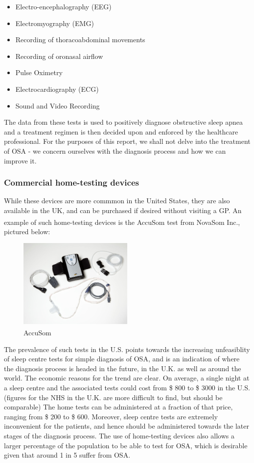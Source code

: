 	\begin{itemize}
	\item Electro-encephalography (EEG)
	\item Electromyography (EMG)
	\item Recording of thoracoabdominal movements
	\item Recording of oronasal airflow
	\item Pulse Oximetry
	\item Electrocardiography (ECG)
	\item Sound and Video Recording
	\end{itemize}

The data from these tests is used to positively diagnose obstructive
sleep apnea and a treatment regimen is then decided upon and enforced
by the healthcare professional. For the purposes of this report, we
shall not delve into the treatment of OSA - we concern ourselves with
the diagnosis process and how we can improve it.


\subsubsection{Commercial home-testing devices}

While these devices are more commmon in the United States, they are
also available in the UK, and can be purchased if desired without
visiting a GP. An example of such home-testing devices is the AccuSom\textsuperscript{\textregistered{}} test from NovaSom Inc., pictured below: 

\begin{figure}[!ht]
\centering
\includegraphics[width=0.5\textwidth]{drawings/Novasom}
\caption{AccuSom\textsuperscript{\textregistered{}}}
\label{fig:Novacom}
\end{figure}

The prevalence of such tests in the U.S. points towards the increasing
unfeasiblity of sleep centre tests for simple diagnosis of OSA, and
is an indication of where the diagnosis process is headed in the future,
in the U.K. as well as around the world. The economic reasons for
the trend are clear. On average, a single night at a sleep centre
and the associated tests could cost from \$ 800 to \$ 3000 in the U.S.
(figures for the NHS in the U.K. are more difficult to find, but should
be comparable) The home tests can be administered at a fraction of
that price, ranging from \$ 200 to \$ 600. Moreover, sleep centre tests
are extremely inconvenient for the patients, and hence should be administered
towards the later stages of the diagnosis process. The use of home-testing
devices also allows a larger percentage of the population to be able
to test for OSA, which is desirable given that around 1 in 5 suffer
from OSA.


